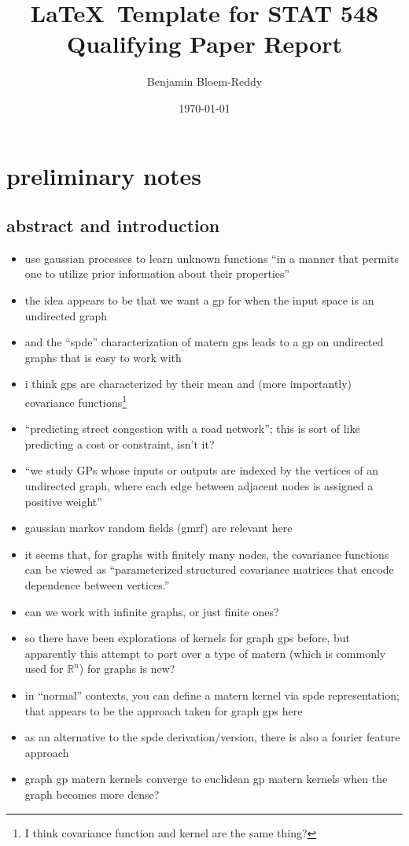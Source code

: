 \documentclass[10pt]{article}
\title{\LaTeX\ Template for STAT 548 Qualifying Paper Report} %
\author{Benjamin Bloem-Reddy} %
\date{\today} %
\begin{document}
\maketitle

\section{preliminary notes}

\subsection{abstract and introduction}

\begin{itemize}
    \item use gaussian processes to learn unknown functions ``in a manner that permits one to utilize prior information about their properties''
    \item the idea appears to be that we want a gp for when the input space is an undirected graph
    \item and the ``spde'' characterization of matern gps leads to a gp on undirected graphs that is easy to work with
    \item i think gps are characterized by their mean and (more importantly) covariance functions\footnote{I think covariance function and kernel are the same thing?}
    \item ``predicting street congestion with a road network''; this is sort of like predicting a cost or constraint, isn't it?
    \item ``we study GPs whose inputs or outputs are indexed by the vertices of an undirected graph, where each edge between adjacent nodes is assigned a positive weight''
    \item gaussian markov random fields (gmrf) are relevant here
    \item it seems that, for graphs with finitely many nodes, the covariance functions can be viewed as ``parameterized structured covariance matrices that encode dependence between vertices.''
    \item can we work with infinite graphs, or just finite ones?
    \item so there have been explorations of kernels for graph gps before, but apparently this attempt to port over a type of matern (which is commonly used for $\mathbb R^n$) for graphs is new?
    \item in ``normal'' contexts, you can define a matern kernel via spde representation; that appears to be the approach taken for graph gps here
    \item as an alternative to the spde derivation/version, there is also a fourier feature approach
    \item graph gp matern kernels converge to euclidean gp matern kernels when the graph becomes more dense?
\end{itemize}
\end{document}
